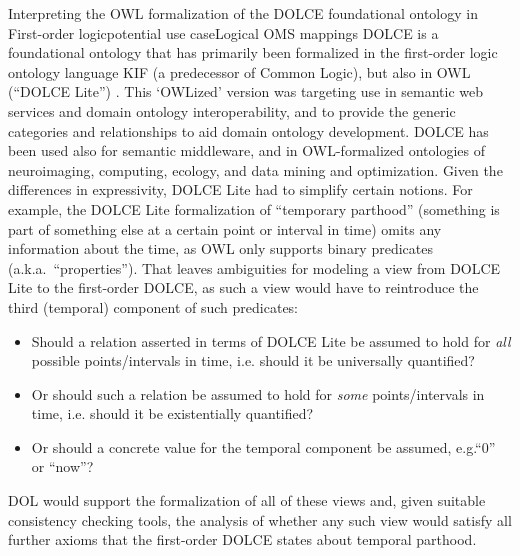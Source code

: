 \documentclass[10pt,fleqn,%
\ifpretendfinal
final%
\else
draft%
\fi,
]{scrreprt}
\makeatletter
\newcommand*{\eg}{e.g.\@\xspace}
\newcommand*{\ie}{i.e.\@\xspace}
\makeatother
\begin{document}
\begin{usecase}{Interpreting the OWL formalization of the DOLCE foundational ontology in First-order logic}{potential use case}{Logical OMS mappings}
  DOLCE is a foundational ontology that has primarily been formalized in the first-order logic ontology language KIF (a predecessor of Common Logic), but also in OWL (``DOLCE Lite'') \cite{dolce}. This ‘OWLized’ version was targeting use in semantic web services and domain ontology interoperability, and to provide the generic categories and relationships to aid domain ontology development. DOLCE has been used also for semantic middleware, and in OWL-formalized ontologies of neuroimaging, computing, ecology, and data mining and optimization.
  Given the differences in expressivity, DOLCE Lite had to simplify certain notions.  For example, the DOLCE Lite formalization of ``temporary parthood'' (something is part of something else at a certain point or interval in time) omits any information about the time, as OWL only supports binary predicates (a.k.a.\ ``properties'').  That leaves ambiguities for modeling a view from DOLCE Lite to the first-order DOLCE, as such a view would have to reintroduce the third (temporal) component of such predicates:
  \begin{itemize}
  \item Should a relation asserted in terms of DOLCE Lite be assumed to hold for \emph{all} possible points/intervals in time, \ie should it be universally quantified?
  \item Or should such a relation be assumed to hold for \emph{some} points/intervals in time, \ie should it be existentially quantified?
  \item Or should a concrete value for the temporal component be assumed, \eg ``0'' or ``now''?
  \end{itemize}
  
  DOL would support the formalization of  all of these views and, given suitable consistency checking tools, the analysis of  whether any such view would satisfy all further axioms that the first-order DOLCE states about temporal parthood.
\end{usecase}
\end{document}
